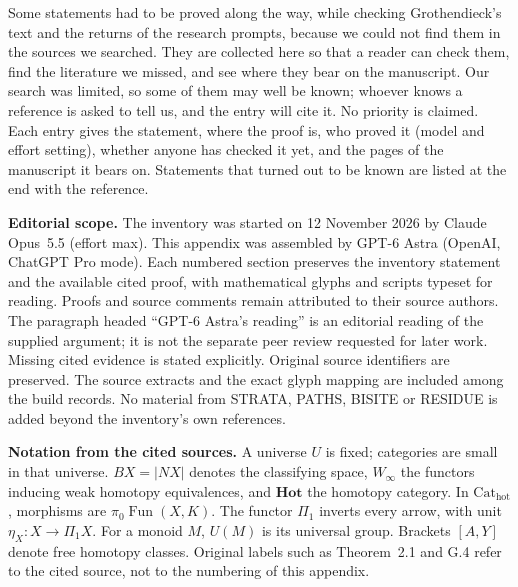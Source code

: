 \begingroup
{}
\providecommand{\Set}{\mathbf{Set}}
\providecommand{\Ab}{\mathbf{Ab}}
\providecommand{\Winfty}{W_\infty}
\providecommand{\Hot}{\mathbf{Hot}}
\providecommand{\Z}{\mathbb{Z}}
\providecommand{\Hom}{\operatorname{Hom}}
\providecommand{\id}{\operatorname{id}}
\providecommand{\colim}{\mathop{\operatorname{colim}}}
\newtheorem{nrdefinition}{Source definition}
\newtheorem{nrlemma}{Source lemma}
\newtheorem{nrtheorem}{Source theorem}
\newtheorem{nrproposition}{Source proposition}
\newenvironment{nrsourceclaim}[3]{\par\medskip\noindent\textbf{Source #1. #3}\quad\textit{#2}\par\smallskip}{\par\medskip}


Some statements had to be proved along the way, while checking Grothendieck's text and the returns of the research prompts, because we could not find them in the sources we searched. They are collected here so that a reader can check them, find the literature we missed, and see where they bear on the manuscript. Our search was limited, so some of them may well be known; whoever knows a reference is asked to tell us, and the entry will cite it. No priority is claimed. Each entry gives the statement, where the proof is, who proved it (model and effort setting), whether anyone has checked it yet, and the pages of the manuscript it bears on. Statements that turned out to be known are listed at the end with the reference.

\noindent\textbf{Editorial scope.} The inventory was started on 12 November 2026 by Claude Opus~5.5 (effort max). This appendix was assembled by GPT-6 Astra (OpenAI, ChatGPT Pro mode). Each numbered section preserves the inventory statement and the available cited proof, with mathematical glyphs and scripts typeset for reading. Proofs and source comments remain attributed to their source authors. The paragraph headed ``GPT-6 Astra's reading'' is an editorial reading of the supplied argument; it is not the separate peer review requested for later work. Missing cited evidence is stated explicitly. Original source identifiers are preserved. The source extracts and the exact glyph mapping are included among the build records. No material from STRATA, PATHS, BISITE or RESIDUE is added beyond the inventory's own references.
\par\medskip
\noindent\textbf{Notation from the cited sources.} A universe $U$ is fixed; categories are small in that universe. $BX=|NX|$ denotes the classifying space, $W_\infty$ the functors inducing weak homotopy equivalences, and $\mathbf{Hot}$ the homotopy category. In $\mathrm{Cat}_{\mathrm{hot}}$, morphisms are $\pi_0\operatorname{Fun}(X,K)$. The functor $\Pi_1$ inverts every arrow, with unit $\eta_X:X\to\Pi_1X$. For a monoid $M$, $U(M)$ is its universal group. Brackets $[A,Y]$ denote free homotopy classes. Original labels such as Theorem~2.1 and G.4 refer to the cited source, not to the numbering of this appendix.


